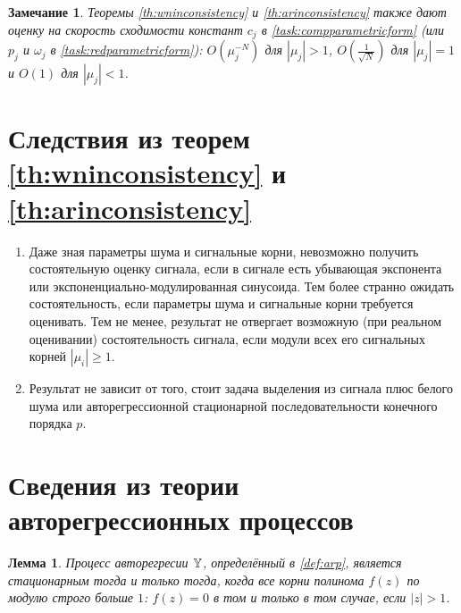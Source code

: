\documentclass[12pt,a4paper]{article}
\newtheorem{lemma}{Лемма}
\newtheorem{remark}{Замечание}
\begin{document}
\begin{remark}
	Теоремы \ref{th:wninconsistency} и \ref{th:arinconsistency} также дают оценку на скорость сходимости констант $c_j$ в \eqref{task:compparametricform} (или $p_j$ и $\omega_j$ в \eqref{task:redparametricform}): $O(\mu_j^{-N})$ для $|\mu_j| > 1$, $O(\frac{1}{\sqrt{N}})$ для $|\mu_j| = 1$ и $O(1)$ для $|\mu_j| < 1$.
\end{remark}


\section{Следствия из теорем \ref{th:wninconsistency} и \ref{th:arinconsistency}}
\begin{enumerate}
	\item Даже зная параметры шума и сигнальные корни, невозможно получить состоятельную оценку сигнала, если в сигнале есть убывающая экспонента или экспоненциально-модулированная синусоида. Тем более странно ожидать состоятельность, если параметры шума и сигнальные корни требуется оценивать. Тем не менее, результат не отвергает возможную (при реальном оценивании) состоятельность сигнала, если модули всех его сигнальных корней $|\mu_i| \ge 1$.
		
	\item Результат не зависит от того, стоит задача выделения из сигнала плюс белого шума или авторегрессионной стационарной последовательности конечного порядка $p$. \cite{ZhigljavskyGolyandinaGryaznov2016}
\end{enumerate}

\section{Сведения из теории авторегрессионных процессов}

\begin{lemma}\label{th:stat}
	Процесс авторегресии $\mathbb{Y}$, определённый в \eqref{def:arp}, является стационарным тогда и только тогда, когда все корни полинома $f(z)$ по модулю строго больше $1$: $f(z) = 0$ в том и только в том случае, если $|z| > 1$.
\end{lemma}
\end{document}
